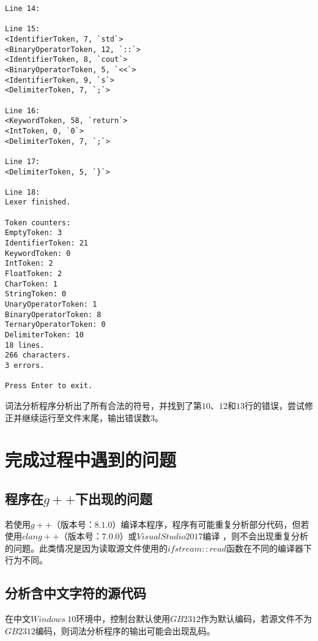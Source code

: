 \documentclass[UTF8]{ctexart}
\begin{document}
\begin{verbatim}
Line 14:

Line 15:
<IdentifierToken, 7, `std`>
<BinaryOperatorToken, 12, `::`>
<IdentifierToken, 8, `cout`>
<BinaryOperatorToken, 5, `<<`>
<IdentifierToken, 9, `s`>
<DelimiterToken, 7, `;`>

Line 16:
<KeywordToken, 58, `return`>
<IntToken, 0, `0`>
<DelimiterToken, 7, `;`>

Line 17:
<DelimiterToken, 5, `}`>

Line 18:
Lexer finished.

Token counters:
EmptyToken: 3
IdentifierToken: 21
KeywordToken: 0
IntToken: 2
FloatToken: 2
CharToken: 1
StringToken: 0
UnaryOperatorToken: 1
BinaryOperatorToken: 8
TernaryOperatorToken: 0
DelimiterToken: 10
18 lines.
266 characters.
3 errors.

Press Enter to exit.
  \end{verbatim}
词法分析程序分析出了所有合法的符号，并找到了第$10$、$12$和$13$行的错误，尝试修正并继续运行至文件末尾，输出错误数$3$。
\section{完成过程中遇到的问题}
\subsection{程序在$g++$下出现的问题}
若使用$g++$（版本号：$8.1.0$）编译本程序，程序有可能重复分析部分代码，但若使用$clang++$（版本号：$7.0.0$）或$Visual Studio 2017$编译
，则不会出现重复分析的问题。此类情况是因为读取源文件使用的$ifstream::read$函数在不同的编译器下行为不同。
\subsection{分析含中文字符的源代码}
在中文$Windows \ 10$环境中，控制台默认使用$GB2312$作为默认编码，若源文件不为$GB2312$编码，则词法分析程序的输出可能会出现乱码。
\end{document}
